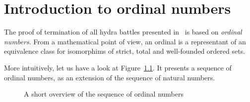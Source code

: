 \chapter{Introduction to ordinal numbers}


The proof of termination of all hydra battles presented in~\cite{KP82} is based
on \emph{ordinal numbers}.
From a mathematical point of view, an ordinal is a representant of an equivalence class for isomorphims of strict, total and well-founded ordered sets.

More intuitively, let us have a look at Figure~\ref{fig:ordinal-sequence}. It presents a sequence of ordinal numbers, as an extension of the sequence of natural numbers. 




\begin{figure}[h]
  \centering
{}
 
 
  \caption{A short overview of the sequence of ordinal numbers}
  \label{fig:ordinal-sequence}
\end{figure}


